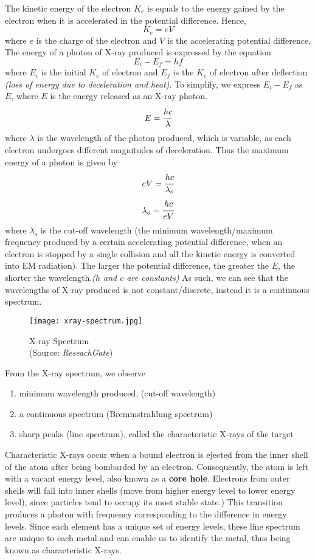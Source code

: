 \documentclass{article}
\begin{document}
The kinetic energy of the electron $K_e$ is equals to the energy gained by the electron when it is accelerated in the potential difference. Hence,
$$K_e=eV$$
where $e$ is the charge of the electron and $V$ is the accelerating potential difference.
The energy of a photon of X-ray produced is expressed by the equation
$$E_i-E_f=hf$$
where $E_i$ is the initial $K_e$ of electron and $E_f$ is the $K_e$ of electron after deflection \textit{(loss of energy due to deceleration and heat)}. To simplify, we express $E_i-E_f$ as $E$, where $E$ is the energy released as an X-ray photon.
$$E=\cfrac{hc}{\lambda}$$
where $\lambda$ is the wavelength of the photon produced, which is variable, as each electron undergoes different magnitudes of deceleration.
Thus the maximum energy of a photon is given by 
$$eV=\cfrac{hc}{\lambda_o}$$
$$\lambda_o=\cfrac{hc}{eV}$$
where $\lambda_o$ is the cut-off wavelength (the minimum wavelength/maximum frequency produced by a certain accelerating potential difference, when an electron is stopped by a single collision and all the kinetic energy is converted into EM radiation). The larger the potential difference, the greater the $E$, the shorter the wavelength.\textit{($h$ and $c$ are constants)}  
As such, we can see that the wavelengths of X-ray produced is not constant/discrete, instead it is a continuous spectrum.

\begin{figure}[H]
    \centering
    \captionsetup{justification=centering,margin=2cm}
    \texttt{[image: xray-spectrum.jpg]}
    \caption*{X-ray Spectrum \\ (Source: \textit{ReseachGate})}
\end{figure}

From the X-ray spectrum, we observe 
\begin{enumerate}
    \item minimum wavelength produced, (cut-off wavelength)
    \item a continuous spectrum (Bremmstrahlung spectrum)
    \item sharp peaks (line spectrum), called the characteristic X-rays of the target
\end{enumerate} 

Characteristic X-rays occur when a bound electron is ejected from the inner shell of the atom after being bombarded by an electron. Consequently, the atom is left with a vacant energy level, also known as a \textbf{core hole}. Electrons from outer shells will fall into inner shells (move from higher energy level to lower energy level), since particles tend to occupy its most stable state.) This transition produces a photon with frequency corresponding to the difference in energy levels. Since each element has a unique set of energy levels, these line spectrum are unique to each metal and can enable us to identify the metal, thus being known as characteristic X-rays.
\end{document}
